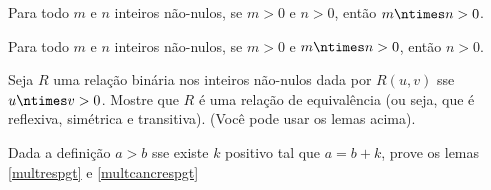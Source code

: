 \begin{definition}[Lema 1]
	\label{multrespgt}
	Para todo $m$ e $n$ inteiros não-nulos, se $m > 0$ e $n > 0$, então $m \ntimes n > 0$.
\end{definition}

\begin{definition}[Lema 2]
	\label{multcancrespgt}
	Para todo $m$ e $n$ inteiros não-nulos, se $m > 0$ e $m \ntimes n > 0$, então $n > 0$.
\end{definition}

\begin{exercise}
Seja $R$ uma relação binária nos inteiros não-nulos dada por $R(u, v)$ sse $u \ntimes v > 0$.
Mostre que $R$ é uma relação de equivalência (ou seja, que é reflexiva, simétrica e transitiva).
(Você pode usar os lemas acima).
\end{exercise}

\begin{homework}
Dada a definição $a > b$ sse existe $k$ positivo tal que $a = b + k$, prove os lemas \ref{multrespgt} e \ref{multcancrespgt}
\end{homework}